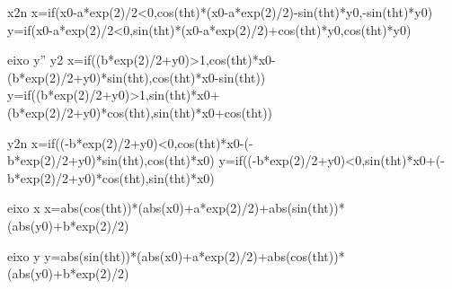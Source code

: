 x2n
x=if(x0-a*exp(2)/2<0,cos(tht)*(x0-a*exp(2)/2)-sin(tht)*y0,-sin(tht)*y0)
y=if(x0-a*exp(2)/2<0,sin(tht)*(x0-a*exp(2)/2)+cos(tht)*y0,cos(tht)*y0)

eixo y''
y2
x=if((b*exp(2)/2+y0)>1,cos(tht)*x0-(b*exp(2)/2+y0)*sin(tht),cos(tht)*x0-sin(tht))
y=if((b*exp(2)/2+y0)>1,sin(tht)*x0+(b*exp(2)/2+y0)*cos(tht),sin(tht)*x0+cos(tht))

y2n
x=if((-b*exp(2)/2+y0)<0,cos(tht)*x0-(-b*exp(2)/2+y0)*sin(tht),cos(tht)*x0)
y=if((-b*exp(2)/2+y0)<0,sin(tht)*x0+(-b*exp(2)/2+y0)*cos(tht),sin(tht)*x0)


eixo x
x=abs(cos(tht))*(abs(x0)+a*exp(2)/2)+abs(sin(tht))*(abs(y0)+b*exp(2)/2)

eixo y
y=abs(sin(tht))*(abs(x0)+a*exp(2)/2)+abs(cos(tht))*(abs(y0)+b*exp(2)/2)
